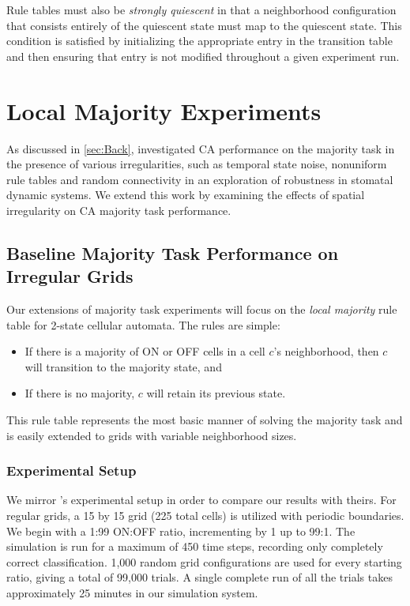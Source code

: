 \documentclass[a4paper,11pt]{article}
\begin{document}
Rule tables must also be \textit{strongly quiescent} in that a neighborhood configuration that consists entirely of the quiescent state must map to the quiescent state. This condition is satisfied by initializing the appropriate entry in the transition table and then ensuring that entry is not modified throughout a given experiment run.


\section{Local Majority Experiments}
\label{sec:local_maj}

As discussed in \ref{sec:Back}, \citeauthor{me07} investigated CA performance on the majority task in the presence of various irregularities, such as temporal state noise, nonuniform rule tables and random connectivity in an exploration of robustness in stomatal dynamic systems. We extend this work by examining the effects of spatial irregularity on CA majority task performance.

\subsection{Baseline Majority Task Performance on Irregular Grids}

Our extensions of majority task experiments will focus on the \textit{local majority} rule table for 2-state cellular automata. The rules are simple:

\begin{itemize}
\item If there is a majority of ON or OFF cells in a cell $c$'s neighborhood, then $c$ will transition to the majority state, and
\item If there is no majority, $c$ will retain its previous state.
\end{itemize}

\noindent This rule table represents the most basic manner of solving the majority task and is easily extended to grids with variable neighborhood sizes.

\subsubsection*{Experimental Setup}
We mirror \citeauthor{me07}'s experimental setup in order to compare our results with theirs. For regular grids, a 15 by 15 grid (225 total cells) is utilized with periodic boundaries. We begin with a 1:99 ON:OFF ratio, incrementing by 1 up to 99:1. The simulation is run for a maximum of 450 time steps, recording only completely correct classification. 1,000 random grid configurations are used for every starting ratio, giving a total of 99,000 trials. A single complete run of all the trials takes approximately 25 minutes in our simulation system.
\end{document}
